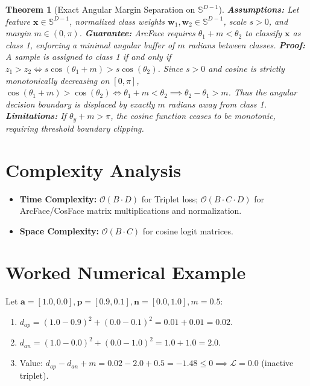 \documentclass[11pt]{article}
\newtheorem{theorem}{Theorem}
\begin{document}
\begin{theorem}[Exact Angular Margin Separation on $\mathbb{S}^{D-1}$]
\label{thm:arcface_boundary}
\textbf{Assumptions:} Let feature $\mathbf{x} \in \mathbb{S}^{D-1}$, normalized class weights $\mathbf{w}_1, \mathbf{w}_2 \in \mathbb{S}^{D-1}$, scale $s > 0$, and margin $m \in (0, \pi)$.
\textbf{Guarantee:} ArcFace requires $\theta_1 + m < \theta_2$ to classify $\mathbf{x}$ as class 1, enforcing a minimal angular buffer of $m$ radians between classes.
\textbf{Proof:}
A sample is assigned to class 1 if and only if $z_1 > z_2 \iff s \cos(\theta_1 + m) > s \cos(\theta_2)$.
Since $s > 0$ and cosine is strictly monotonically decreasing on $[0, \pi]$, $\cos(\theta_1 + m) > \cos(\theta_2) \iff \theta_1 + m < \theta_2 \implies \theta_2 - \theta_1 > m$.
Thus the angular decision boundary is displaced by exactly $m$ radians away from class 1.
\textbf{Limitations:} If $\theta_y + m > \pi$, the cosine function ceases to be monotonic, requiring threshold boundary clipping.
\end{theorem}

\section{Complexity Analysis}
\label{sec:complexity}

\begin{itemize}
    \item \textbf{Time Complexity:} $\mathcal{O}(B \cdot D)$ for Triplet loss; $\mathcal{O}(B \cdot C \cdot D)$ for ArcFace/CosFace matrix multiplications and normalization.
    \item \textbf{Space Complexity:} $\mathcal{O}(B \cdot C)$ for cosine logit matrices.
\end{itemize}

\section{Worked Numerical Example}
\label{sec:worked_example}

Let $\mathbf{a} = [1.0, 0.0], \mathbf{p} = [0.9, 0.1], \mathbf{n} = [0.0, 1.0], m = 0.5$:
\begin{enumerate}
    \item $d_{ap} = (1.0 - 0.9)^2 + (0.0 - 0.1)^2 = 0.01 + 0.01 = 0.02$.
    \item $d_{an} = (1.0 - 0.0)^2 + (0.0 - 1.0)^2 = 1.0 + 1.0 = 2.0$.
    \item Value: $d_{ap} - d_{an} + m = 0.02 - 2.0 + 0.5 = -1.48 \le 0 \implies \mathcal{L} = 0.0$ (inactive triplet).
\end{enumerate}
\end{document}
